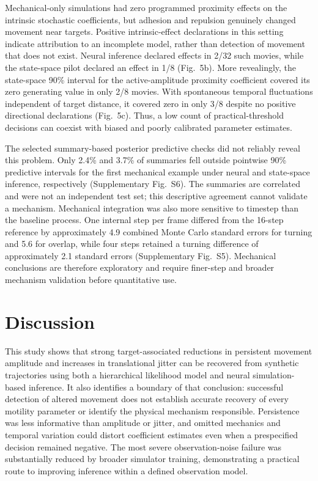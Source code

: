 \documentclass[12pt]{article}
\begin{document}
Mechanical-only simulations had zero programmed proximity effects on the intrinsic stochastic coefficients, but adhesion and repulsion genuinely changed movement near targets. Positive intrinsic-effect declarations in this setting indicate attribution to an incomplete model, rather than detection of movement that does not exist. Neural inference declared effects in 2/32 such movies, while the state-space pilot declared an effect in 1/8 (Fig.~5b). More revealingly, the state-space 90\% interval for the active-amplitude proximity coefficient covered its zero generating value in only 2/8 movies. With spontaneous temporal fluctuations independent of target distance, it covered zero in only 3/8 despite no positive directional declarations (Fig.~5c). Thus, a low count of practical-threshold decisions can coexist with biased and poorly calibrated parameter estimates.

The selected summary-based posterior predictive checks did not reliably reveal this problem. Only 2.4\% and 3.7\% of summaries fell outside pointwise 90\% predictive intervals for the first mechanical example under neural and state-space inference, respectively (Supplementary Fig.~S6). The summaries are correlated and were not an independent test set; this descriptive agreement cannot validate a mechanism. Mechanical integration was also more sensitive to timestep than the baseline process. One internal step per frame differed from the 16-step reference by approximately 4.9 combined Monte Carlo standard errors for turning and 5.6 for overlap, while four steps retained a turning difference of approximately 2.1 standard errors (Supplementary Fig.~S5). Mechanical conclusions are therefore exploratory and require finer-step and broader mechanism validation before quantitative use.

\section*{Discussion}
This study shows that strong target-associated reductions in persistent movement amplitude and increases in translational jitter can be recovered from synthetic trajectories using both a hierarchical likelihood model and neural simulation-based inference. It also identifies a boundary of that conclusion: successful detection of altered movement does not establish accurate recovery of every motility parameter or identify the physical mechanism responsible. Persistence was less informative than amplitude or jitter, and omitted mechanics and temporal variation could distort coefficient estimates even when a prespecified decision remained negative. The most severe observation-noise failure was substantially reduced by broader simulator training, demonstrating a practical route to improving inference within a defined observation model.
\end{document}
